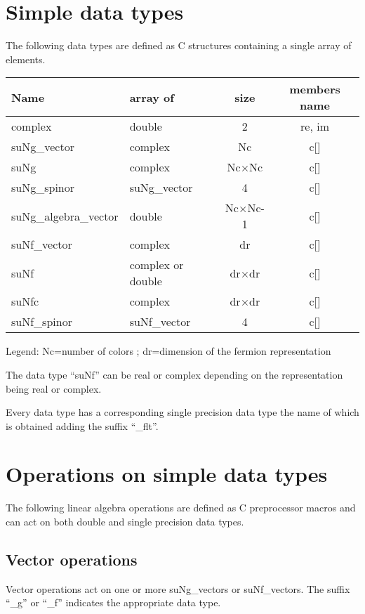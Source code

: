 \documentclass[10pt]{article}
\begin{document}
\section{Simple data types}

The following data types are defined as C structures containing a single array of elements.

\begin{center}
\begin{tabular}{llcc}
\hline
Name & array of & size & members name \\
\hline
\hline
complex & double & 2 & re, im \\
\hline
suNg\_vector & complex & Nc & c[]\\
suNg & complex & Nc$\times$Nc & c[]\\
suNg\_spinor & suNg\_vector  & 4 & c[]\\
suNg\_algebra\_vector & double & Nc$\times$Nc-1 & c[]\\
\hline
suNf\_vector & complex & dr & c[]\\
suNf & complex or double & dr$\times$dr & c[]\\
suNfc & complex & dr$\times$dr & c[]\\
suNf\_spinor & suNf\_vector  & 4 & c[]
\end{tabular}
\end{center}
Legend: Nc=number of colors ; dr=dimension of the fermion representation

The data type ``suNf'' can be real or complex depending on the representation being real or complex.

Every data type has a corresponding single precision data type the name of which is obtained adding the suffix ``\_flt''.


\section{Operations on simple data types}
The following linear algebra operations are defined as C preprocessor macros and can act on both double and single precision data types.

\subsection{Vector operations\label{vop}}

Vector operations act on one or more suNg\_vectors or suNf\_vectors. The suffix ``\_g'' or ``\_f'' indicates the appropriate data type.\\
\end{document}
